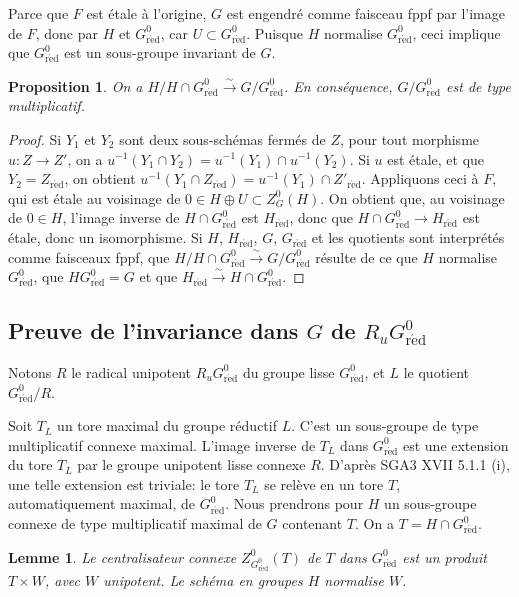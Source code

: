 \documentclass[11pt,a4paper]{article}
\theoremstyle{plain}
\newtheorem{lemma}[theorem]{Lemme}
\newtheorem{proposition}[theorem]{Proposition}
\theoremstyle{definition}
\newcommand{\red}{\mathrm{r\acute{e}d}}
\begin{document}
Parce que $F$ est \'etale \`a l'origine, $G$ est engendr\'e comme faisceau fppf par l'image de $F$, donc par $H$ et $G^0_\red$, car $U \subset G^0_\red$. Puisque $H$ normalise $G^0_\red$, ceci implique que $G^0_\red$ est un sous-groupe invariant de $G$.

\begin{proposition}\label{sec:1.19}
On a $H/H \cap G^0_\red \xrightarrow{\sim} G/G^0_\red$. En cons\'equence, $G/G^0_\red$ est de type multiplicatif.
\end{proposition}

\begin{proof}
Si $Y_1$ et $Y_2$ sont deux sous-sch\'emas ferm\'es de $Z$, pour tout morphisme $u: Z \to Z'$, on a $u^{-1}(Y_1 \cap Y_2) = u^{-1}(Y_1) \cap u^{-1}(Y_2)$. Si $u$ est \'etale, et que $Y_2 = Z_\red$, on obtient $u^{-1}(Y_1 \cap Z_\red) = u^{-1}(Y_1) \cap Z'_\red$. Appliquons ceci \`a $F$, qui est \'etale au voisinage de $0 \in H \oplus U \subset Z^0_G(H)$. On obtient que, au voisinage de $0 \in H$, l'image inverse de $H \cap G^0_\red$ est $H_\red$, donc que $H \cap G^0_\red \to H_\red$ est \'etale, donc un isomorphisme. Si $H$, $H_\red$, $G$, $G_\red$ et les quotients sont interpr\'et\'es comme faisceaux fppf, que $H/H \cap G^0_\red \xrightarrow{\sim} G/G^0_\red$ r\'esulte de ce que $H$ normalise $G^0_\red$, que $HG^0_\red = G$ et que $H_\red \xrightarrow{\sim} H \cap G^0_\red$.
\end{proof}

\subsection{Preuve de l'invariance dans $G$ de $R_u G^0_\red$}\label{sec:1.20}

Notons $R$ le radical unipotent $R_u G^0_\red$ du groupe lisse $G^0_\red$, et $L$ le quotient $G^0_\red/R$.

Soit $T_L$ un tore maximal du groupe r\'eductif $L$. C'est un sous-groupe de type multiplicatif connexe maximal. L'image inverse de $T_L$ dans $G^0_\red$ est une extension du tore $T_L$ par le groupe unipotent lisse connexe $R$. D'apr\`es SGA3 XVII 5.1.1 (i), une telle extension est triviale: le tore $T_L$ se rel\`eve en un tore $T$, automatiquement maximal, de $G^0_\red$. Nous prendrons pour $H$ un sous-groupe connexe de type multiplicatif maximal de $G$ contenant $T$. On a $T = H \cap G^0_\red$.

\begin{lemma}\label{lem:1.21}
Le centralisateur connexe $Z^0_{G^0_\red}(T)$ de $T$ dans $G^0_\red$ est un produit $T \times W$, avec $W$ unipotent. Le sch\'ema en groupes $H$ normalise $W$.
\end{lemma}
\end{document}
